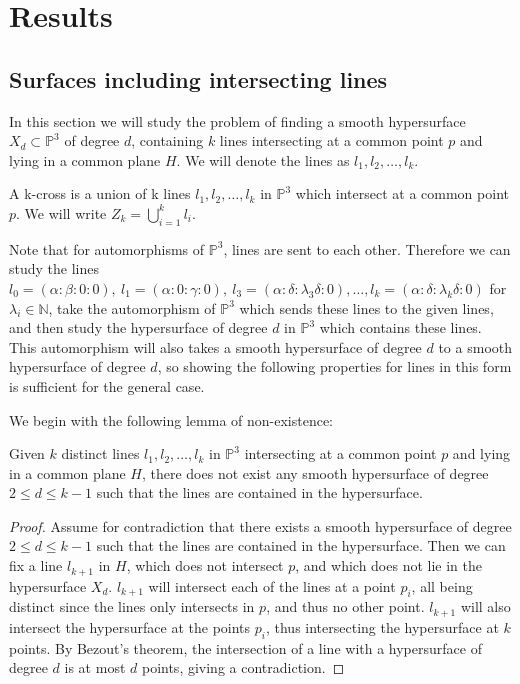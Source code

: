\chapter{Results}
\label{results}
\section{Surfaces including intersecting lines}

In this section we will study the problem of finding a smooth hypersurface $X_d \subset \mathbb{P}^3$ of degree $d$, containing $k$ lines intersecting at a common point $p$ and lying in a common plane $H$. We will denote the lines as $l_1, l_2, \dots, l_k$. 

\begin{definition}
    A k-cross is a union of k lines $l_1, l_2, \dots, l_k$ in $\mathbb{P}^3$ which intersect at a common point $p$. We will write $Z_k = \bigcup_{i=1}^k l_i$.
\end{definition}

\begin{remark}
    Note that for automorphisms of $\mathbb{P}^3$, lines are sent to each other. Therefore we can study the lines $l_0 = (\alpha : \beta : 0 : 0), \ l_1 = (\alpha : 0 : \gamma : 0), \ l_3=(\alpha: \delta : \lambda_3 \delta: 0), \dots, l_k = (\alpha : \delta : \lambda_k \delta : 0)$ for $\lambda_i \in \mathbb{N}$, take the automorphism of $\mathbb{P}^3$ which sends these lines to the given lines, and then study the hypersurface of degree $d$ in $\mathbb{P}^3$ which contains these lines.
    This automorphism will also takes a smooth hypersurface of degree $d$ to a smooth hypersurface of degree $d$, so showing the following properties for  lines in this form is sufficient for the general case. 
\end{remark}

We begin with the following lemma of non-existence:

\begin{lemma}
    Given $k$ distinct lines $l_1, l_2, \dots, l_k$ in $\mathbb{P}^3$ intersecting at a common point $p$ and lying in a common plane $H$, there does not exist any smooth hypersurface of degree $2 \leq d \leq k-1$ such that the lines are contained in the hypersurface.
\end{lemma}
\begin{proof}
    Assume for contradiction that there exists a smooth hypersurface of degree $2 \leq d \leq k-1$ such that the lines are contained in the hypersurface. 
    Then we can fix a line $l_{k+1}$ in $H$, which does not intersect $p$, and which does not lie in the hypersurface $X_d$.
    $l_{k+1}$ will intersect each of the lines at a point $p_i$, all being distinct since the lines only intersects in $p$, and thus no other point. 
    $l_{k+1}$ will also intersect the hypersurface at the points $p_i$, thus intersecting the hypersurface at $k$ points.
    By Bezout's theorem, the intersection of a line with a hypersurface of degree $d$ is at most $d$ points, giving a contradiction.
\end{proof}

